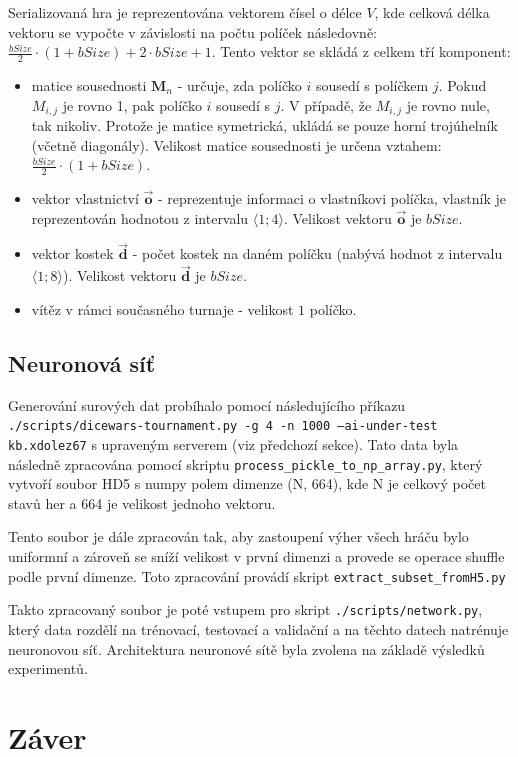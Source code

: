 \documentclass[a4paper, 11pt]{article}
\begin{document}
Serializovaná hra je reprezentována vektorem čísel o délce $V$, kde celková délka vektoru se vypočte v závislosti na počtu políček následovně: $\frac{bSize}{2} \cdot (1+bSize) + 2 \cdot bSize + 1$. Tento vektor se skládá z celkem tří komponent: 
\begin{itemize}
	\item matice sousednosti $\bm{M}_{n}$ - určuje, zda políčko $i$ sousedí s políčkem $j$. Pokud \textit{$M_{i,j}$} je rovno 1, pak políčko $i$ sousedí s $j$. V případě, že \textit{$M_{i,j}$} je rovno nule, tak nikoliv. Protože je matice symetrická, ukládá se pouze horní trojúhelník (včetně diagonály). Velikost matice sousednosti je určena vztahem: $\frac{bSize}{2} \cdot (1+bSize)$.
	\item vektor vlastnictví $\bm{\vec{o}}$ - reprezentuje informaci o vlastníkovi políčka, vlastník je reprezentován hodnotou z intervalu $\langle 1;4 \rangle$. Velikost vektoru $\bm{\vec{o}}$ je $bSize$.
	\item vektor kostek $\bm{\vec{d}}$ - počet kostek na daném políčku (nabývá hodnot z intervalu $\langle 1;8 \rangle$).  Velikost vektoru $\bm{\vec{d}}$ je $bSize$.
	\item vítěz v rámci současného turnaje - velikost $1$ políčko.
\end{itemize}

\subsection{Neuronová síť}


Generování surových dat probíhalo pomocí následujícího příkazu \texttt{./scripts/dicewars-tournament.py -g 4 -n 1000 --ai-under-test kb.xdolez67} s upraveným serverem (viz předchozí sekce). Tato data byla následně zpracována pomocí skriptu \texttt{process\_pickle\_to\_np\_array.py}, který vytvoří soubor HD5 s numpy polem dimenze (N, 664), kde N je celkový počet stavů her a 664 je velikost jednoho vektoru.

Tento soubor je dále zpracován tak, aby zastoupení výher všech hráču bylo uniformní a zároveň se sníží velikost v první dimenzi a provede se operace shuffle podle první dimenze. Toto zpracování provádí skript \texttt{extract\_subset\_fromH5.py}

Takto zpracovaný soubor je poté vstupem pro skript \texttt{./scripts/network.py}, který data rozdělí na trénovací, testovací a validační a na těchto datech natrénuje neuronovou síť. Architektura neuronové sítě byla zvolena na základě výsledků experimentů.



\section{Záver}

\end{document}

